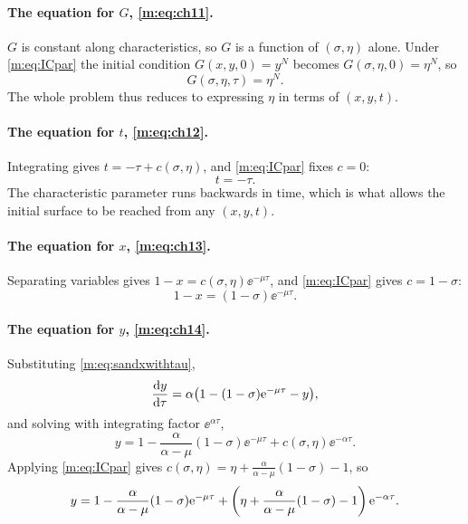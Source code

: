 \paragraph{The equation for $G$, \eqref{m:eq:ch11}.}
$G$ is constant along characteristics, so $G$ is a function of $(\sigma,\eta)$
alone. Under \cref{m:eq:ICpar} the initial condition $G(x,y,0)=y^N$ becomes
$G(\sigma,\eta,0)=\eta^N$, so
\begin{equation}
\label{m:eq:GetaN}
G(\sigma,\eta,\tau) = \eta^N .
\end{equation}
The whole problem thus reduces to expressing $\eta$ in terms of $(x,y,t)$.

\paragraph{The equation for $t$, \eqref{m:eq:ch12}.}
Integrating gives $t = -\tau + c(\sigma,\eta)$, and \cref{m:eq:ICpar} fixes $c=0$:
\begin{equation}
\label{m:eq:minustau}
t = -\tau .
\end{equation}
The characteristic parameter runs backwards in time, which is what allows the
initial surface to be reached from any $(x,y,t)$.

\paragraph{The equation for $x$, \eqref{m:eq:ch13}.}
Separating variables gives $1-x = c(\sigma,\eta)\ee^{-\mu\tau}$, and
\cref{m:eq:ICpar} gives $c = 1-\sigma$:
\begin{equation}
\label{m:eq:sandxwithtau}
1-x = (1-\sigma)\ee^{-\mu\tau} .
\end{equation}

\paragraph{The equation for $y$, \eqref{m:eq:ch14}.}
Substituting \cref{m:eq:sandxwithtau},
\begin{equation*}
\frac{\mathrm{d} y}{\mathrm{d} \tau} = \alpha\bigl(1-(1-\sigma)\mathrm{e}^{-\mu\tau}-y\bigr),
\end{equation*}
and solving with integrating factor $\ee^{\alpha\tau}$,
\begin{equation*}
y = 1-\frac{\alpha}{\alpha-\mu}(1-\sigma)\ee^{-\mu\tau} + c(\sigma,\eta)\ee^{-\alpha\tau} .
\end{equation*}
Applying \cref{m:eq:ICpar} gives
$c(\sigma,\eta) = \eta + \frac{\alpha}{\alpha-\mu}(1-\sigma)-1$, so
\begin{equation}
\label{m:eq:ywitheta}
y = 1-\frac{\alpha}{\alpha-\mu}(1-\sigma)\mathrm{e}^{-\mu\tau}
+ \left(\eta + \frac{\alpha}{\alpha-\mu}(1-\sigma)-1\right)\mathrm{e}^{-\alpha\tau} .
\end{equation}

